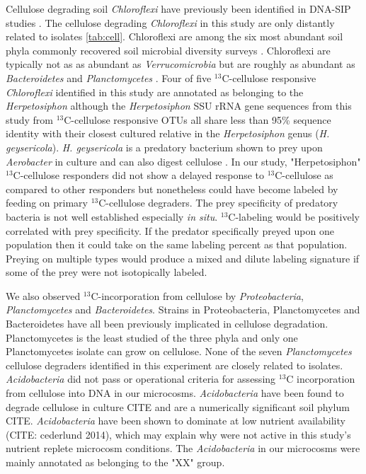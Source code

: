 Cellulose degrading soil \textit{Chloroflexi} have previously been identified
in DNA-SIP studies \citep{Schellenberger_2010}. The cellulose degrading
\textit{Chloroflexi} in this study are only distantly related to isolates
\ref{tab:cell}. Chloroflexi are among the six most abundant soil phyla commonly
recovered soil microbial diversity surveys \citep{Janssen2006}.
Chloroflexi are typically not as as abundant as \textit{Verrucomicrobia} but
are roughly as abundant as \textit{Bacteroidetes} and \textit{Planctomycetes}
\citep{Janssen2006}.  Four of five $^{13}$C-cellulose responsive
\textit{Chloroflexi} identified in this study are annotated as belonging to the
\textit{Herpetosiphon} although the \textit{Herpetosiphon} SSU rRNA gene
sequences from this study from $^{13}$C-cellulose responsive OTUs all share
less than 95\% sequence identity with their closest cultured relative in the
\textit{Herpetosiphon} genus (\textit{H. geysericola}). \textit{H. geysericola}
is a predatory bacterium shown to prey upon \textit{Aerobacter} in culture and
can also digest cellulose \citep{Lewin1970}. In our study, "Herpetosiphon"
$^{13}$C-cellulose responders did not show a delayed response to
$^{13}$C-cellulose as compared to other responders but nonetheless could have
become labeled by feeding on primary $^{13}$C-cellulose degraders. The prey
specificity of predatory bacteria is not well established especially \textit{in
situ}. $^{13}$C-labeling would be positively correlated with prey specificity.
If the predator specifically preyed upon one population then it could take on
the same labeling percent as that population. Preying on multiple types would
produce a mixed and dilute labeling signature if some of the prey
were not isotopically labeled.

We also observed $^{13}$C-incorporation from cellulose by
\textit{Proteobacteria}, \textit{Planctomycetes} and \textit{Bacteroidetes}. 
Strains in Proteobacteria, Planctomycetes and Bacteroidetes have all been
previously implicated in cellulose degradation. Planctomycetes is the
least studied of the three phyla and only one Planctomycetes isolate can
grow on cellulose. None of the seven \textit{Planctomycetes} cellulose degraders
identified in this experiment are closely related to isolates.
\textit{Acidobacteria} did not pass or operational criteria for assessing
$^{13}$C incorporation from cellulose into DNA in our microcosms. 
\textit{Acidobacteria} have been found to degrade cellulose in culture CITE and
are a numerically significant soil phylum CITE. \textit{Acidobacteria} have
been shown to dominate at low nutrient availability (CITE: cederlund 2014),
which may explain why were not active in this study's  nutrient replete
microcosm conditions. The \textit{Acidobacteria} in our microcosms were mainly
annotated as belonging to the "XX" group. 

